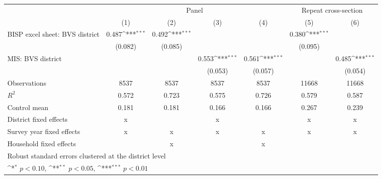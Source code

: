 {
\def\sym#1{\ifmmode^{#1}\else\(^{#1}\)\fi}
\begin{tabular}{l*{6}{c}}
\hline\hline
                    &\multicolumn{4}{c}{Panel}                                                              &\multicolumn{2}{c}{Repeat cross-section}   \\\cmidrule(lr){2-5}\cmidrule(lr){6-7}
                    &\multicolumn{1}{c}{(1)}         &\multicolumn{1}{c}{(2)}         &\multicolumn{1}{c}{(3)}         &\multicolumn{1}{c}{(4)}         &\multicolumn{1}{c}{(5)}         &\multicolumn{1}{c}{(6)}         \\
\hline
BISP excel sheet: BVS district&       0.487\sym{***}&       0.492\sym{***}&                     &                     &       0.380\sym{***}&                     \\
                    &     (0.082)         &     (0.085)         &                     &                     &     (0.095)         &                     \\
[1em]
MIS: BVS district   &                     &                     &       0.553\sym{***}&       0.561\sym{***}&                     &       0.485\sym{***}\\
                    &                     &                     &     (0.053)         &     (0.057)         &                     &     (0.054)         \\
\hline
Observations        &        8537         &        8537         &        8537         &        8537         &       11668         &       11668         \\
\(R^{2}\)           &       0.572         &       0.723         &       0.575         &       0.726         &       0.579         &       0.587         \\
Control mean        &       0.181         &       0.181         &       0.166         &       0.166         &       0.267         &       0.239         \\
District fixed effects&           x         &                     &           x         &                     &           x         &           x         \\
Survey year fixed effects&           x         &           x         &           x         &           x         &           x         &           x         \\
Household fixed effects&                     &           x         &                     &           x         &                     &                     \\
\hline\hline
\multicolumn{7}{l}{\footnotesize Robust standard errors clustered at the district level}\\
\multicolumn{7}{l}{\footnotesize \sym{*} \(p<0.10\), \sym{**} \(p<0.05\), \sym{***} \(p<0.01\)}\\
\end{tabular}
}
